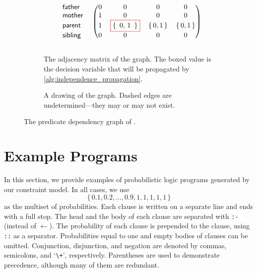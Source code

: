 \begin{figure}[t]
  \begin{subfigure}[b]{0.59\textwidth}
    \centering
    \[
    \begin{blockarray}{lcccc}
      \begin{block}{l!{\quad}(cccc)}
        \mathsf{father} & 0 & 0 & 0 & 0 \\
        \mathsf{mother} & 1 & 0 & 0 & 0 \\
        \mathsf{parent} & 1 & \fbox{\{\, 0, 1 \,\}} & \{\, 0, 1 \,\} & \{\, 0, 1 \,\} \\
        \mathsf{sibling} & 0 & 0 & 0 & 0 \\
      \end{block}
    \end{blockarray}
    \]
    \vspace{-1cm}
    \caption{The adjacency matrix of the graph. The boxed value is the decision
      variable that will be propagated by
      \cref{alg:independence_propagation}.}\label{fig:dependencies_matrix}
  \end{subfigure}%
  \hfill
  \begin{subfigure}[b]{.39\textwidth}
    \centering
    \caption{A drawing of the graph. Dashed edges are undetermined---they may or
      may not exist.}\label{fig:dependencies2}
  \end{subfigure}
  \caption{The predicate dependency graph of
    .}\label{fig:example}
\end{figure}

\section{Example Programs}\label{sec:examples}

In this section, we provide examples of probabilistic logic programs generated
by our constraint model. In all cases, we use
\[
  \{\, 0.1, 0.2, \dots, 0.9, 1, 1, 1, 1, 1 \,\}
\]
as the multiset of probabilities. Each clause is written on a separate line and
ends with a full stop. The head and the body of each clause are separated with
\texttt{:-} (instead of $\gets$). The probability of each clause is prepended to
the clause, using \texttt{::} as a separator. Probabilities equal to one and
empty bodies of clauses can be omitted. Conjunction, disjunction, and negation
are denoted by commas, semicolons, and `\texttt{\textbackslash+}', respectively.
Parentheses are used to demonstrate precedence, although many of them are
redundant.

